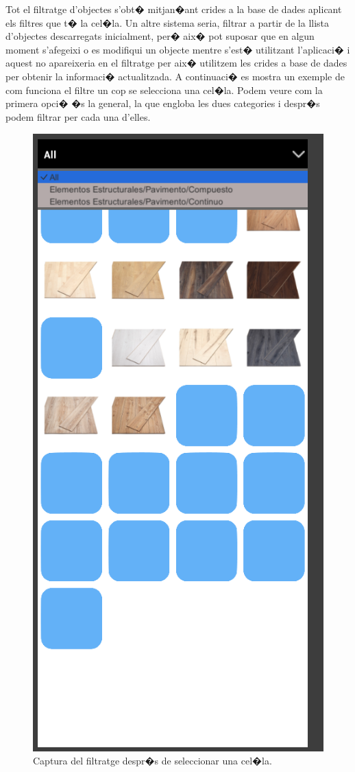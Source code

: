 \documentclass[12pt,a4paper,openright,oneside]{article}
\numberwithin{equation}{section}
\theoremstyle{definition}
\begin{document}
Tot el filtratge d'objectes s'obt� mitjan�ant crides a la base de dades aplicant els filtres que t� la cel�la. Un altre sistema seria, filtrar a partir de la llista d'objectes descarregats inicialment, per� aix� pot suposar que en algun moment s'afegeixi o es modifiqui un objecte mentre s'est� utilitzant l'aplicaci� i aquest no apareixeria en el filtratge per aix� utilitzem les crides a base de dades per obtenir la informaci� actualitzada. A continuaci� es mostra un exemple de com funciona el filtre un cop se selecciona una cel�la. Podem veure com la primera opci� �s la general, la que engloba les dues categories i despr�s podem filtrar per cada una d'elles.
\begin{figure}[h!]
\begin{center}
\includegraphics[scale=0.5]{filter}
\caption{Captura del filtratge despr�s de seleccionar una cel�la.}
\end{center}
\end{figure}
\end{document}
